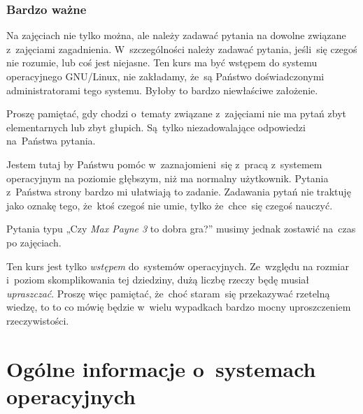 \documentclass[10pt,t]{beamer}
\begin{document}
\begin{frame}
  \frametitle{Bardzo ważne}


  Na zajęciach nie tylko można, ale \alert{należy} zadawać pytania
  na dowolne związane z~zajęciami zagadnienia. W~szczególności
  \alert{należy} zadawać pytania, jeśli~się czegoś nie rozumie, lub coś
  jest niejasne. Ten kurs ma być wstępem do systemu operacyjnego GNU/Linux,
  \alert{nie} zakładamy, że~są Państwo doświadczonymi administratorami tego
  systemu. Byłoby to bardzo niewłaściwe założenie.

  Proszę pamiętać, gdy chodzi o~tematy związane z~zajęciami
  \alert{nie} ma pytań zbyt elementarnych lub zbyt głupich. Są~tylko
  niezadowalające odpowiedzi na~Państwa pytania.

  Jestem tutaj by Państwu pomóc w~zaznajomieni~się z~pracą z~systemem
  operacyjnym na poziomie głębszym, niż ma normalny użytkownik.
  Pytania z~Państwa strony bardzo mi ułatwiają to zadanie. Zadawania pytań
  nie traktuję jako oznakę tego, że~ktoś czegoś nie umie, tylko że~chce~się
  czegoś nauczyć.

  Pytania typu „Czy \textit{Max Payne 3} to dobra gra?” musimy jednak
  zostawić na~czas po zajęciach.

  Ten kurs jest tylko \textit{wstępem} do~systemów operacyjnych. Ze~względu
  na rozmiar i~poziom skomplikowania tej dziedziny, dużą liczbę rzeczy
  będę musiał \textit{upraszczać}. Proszę więc pamiętać, że~choć staram~się
  przekazywać rzetelną wiedzę, to to co mówię będzie w~wielu wypadkach
  bardzo mocny uproszczeniem rzeczywistości.

\end{frame}










\section{Ogólne informacje o~systemach operacyjnych}
\end{document}
